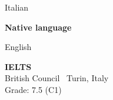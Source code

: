 \begin{minipage}{.3\textwidth}
	\flushright Italian \faLanguage
\end{minipage}
\hfill
\begin{minipage}{.65\textwidth}
	\vfill
	{\large \textbf{Native language}} 
	\vfill
\end{minipage}

\bigskip

\begin{minipage}{.3\textwidth}
	\flushright English \faLanguage
\end{minipage}
\hfill
\begin{minipage}{.64\textwidth}
	\vfill
	{\large \textbf{IELTS}} \\
	\color{Maroon} British Council \hfill \color{Sepia} \faMapMarker \ Turin, Italy \\
	\color{gray} Grade: 7.5 (C1)
	\vfill
\end{minipage}